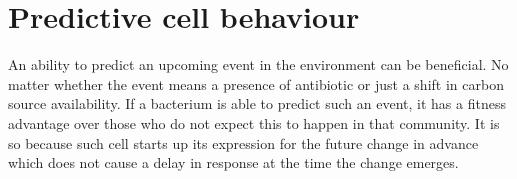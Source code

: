 




\section{Predictive cell behaviour}
An ability to predict an upcoming event in the environment can be beneficial.
No matter whether the event means a presence of antibiotic or just a shift in carbon source availability.
If a bacterium is able to predict such an event, it has a fitness advantage over those who do not expect this to happen in that community.
It is so because such cell starts up its expression for the future change in advance which does not cause a delay in response at the time the change emerges.

